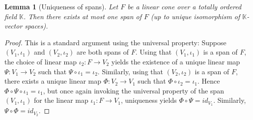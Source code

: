 \documentclass[a4paper,11pt]{article}
\numberwithin{equation}{section}
\theoremstyle{definition}
\theoremstyle{plain}
\newtheorem{Lemma}[Definition]{Lemma}
\begin{document}
\begin{Lemma}[Uniqueness of spans]\label{Lemma: Uniqueness of spans}
Let $F$ be a linear cone over a totally ordered field $\mathbb{K}$. Then there exists at most one span of $F$ (up to unique isomorphism of $\mathbb{K}$-vector spaces).
\end{Lemma}
\begin{proof} This is a standard argument using the universal property: Suppose $(V_1,\iota_1)$ and $(V_2,\iota_2)$ are both spans of $F$. Using that $(V_1,\iota_1)$ is a span of $F$, the choice of linear map $\iota_2:F \to V_2$ yields the existence of a unique linear map $\Psi:V_1 \to V_2$ such that $\Psi \circ \iota_1 = \iota_2$. Similarly, using that $(V_2,\iota_2)$ is a span of $F$, there exists a unique linear map $\Phi: V_2 \to V_1$ such that $\Phi \circ \iota_2 = \iota_1$. Hence $\Phi \circ \Psi \circ \iota_1 = \iota_1$, but once again invoking the universal property of the span $(V_1,\iota_1)$ for the linear map $\iota_1:F \to V_1$, uniqueness yields $\Phi \circ \Psi = id_{V_1}$. Similarly, $\Psi \circ \Phi = id_{V_2}$.
\end{proof}
\end{document}
